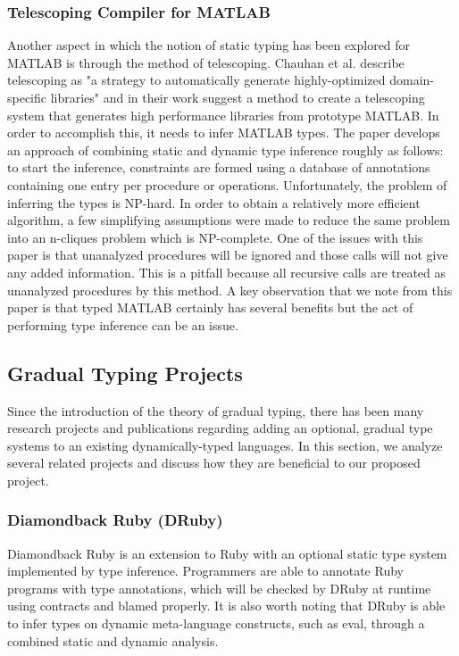 \subsubsection{Telescoping Compiler for MATLAB}
Another aspect in which the notion of static typing has been explored for MATLAB is through the method of telescoping. Chauhan et al. describe telescoping as "a strategy to automatically generate highly-optimized domain-specific libraries" \cite{chauhan2003type} and in their work suggest a method to create a telescoping system that generates high performance libraries from prototype MATLAB. In order to accomplish this, it needs to infer MATLAB types. The paper develops an approach of combining static and dynamic type inference roughly as follows: to start the inference, constraints are formed using a database of annotations containing one entry per procedure or operations. Unfortunately, the problem of inferring the types is NP-hard. In order to obtain a relatively more efficient algorithm, a few simplifying assumptions were made to reduce the same problem into an n-cliques problem which is NP-complete. One of the issues with this paper is that unanalyzed procedures will be ignored and those calls will not give any added information. This is a pitfall because all recursive calls are treated as unanalyzed procedures by this method. A key observation that we note from this paper is that typed MATLAB certainly has several benefits but the act of performing type inference can be an issue.

\subsection{Gradual Typing Projects}
Since the introduction of the theory of gradual typing, there has been many research projects and publications regarding adding an optional, gradual type systems to an existing dynamically-typed languages. In this section, we analyze several related projects and discuss how they are beneficial to our proposed project.

\subsubsection{Diamondback Ruby (DRuby)}
Diamondback Ruby \cite{furr2009combining} is an extension to Ruby with an optional static type system implemented by type inference. Programmers are able to annotate Ruby programs with type annotations, which will be checked by DRuby at runtime using contracts and blamed properly. It is also worth noting that DRuby is able to infer types on dynamic meta-language constructs, such as eval, through a combined static and dynamic analysis.


